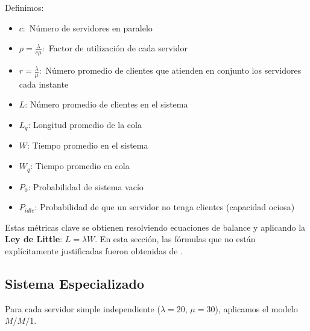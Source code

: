 \documentclass[letterpaper, 12pt]{report}
\begin{document}
Definimos:
\begin{itemize}
\item $c:$ Número de servidores en paralelo
    \item $\rho = \frac{\lambda}{c\mu} :$ Factor de utilización de cada servidor
    \item $r = \frac{\lambda}{\mu} :$ Número promedio de clientes que atienden en conjunto los servidores cada instante
    \item $L$: Número promedio de clientes en el sistema
    \item $L_q$: Longitud promedio de la cola
    \item $W$: Tiempo promedio en el sistema
    \item $W_q$: Tiempo promedio en cola
    \item $P_0$: Probabilidad de sistema vacío
    \item $P_{idle}$: Probabilidad de que un servidor no tenga clientes (capacidad ociosa)
    
\end{itemize}
    
Estas métricas clave se obtienen resolviendo ecuaciones de balance y aplicando la \textbf{Ley de Little}: $L=\lambda W$. En esta sección, las f\'ormulas que no est\'an explícitamente justificadas fueron obtenidas de \cite{sabater2015}.  
    


\subsection{Sistema Especializado}

Para cada servidor simple independiente ($\lambda=20$, $\mu=30$), aplicamos el modelo $M/M/1$.
\end{document}
